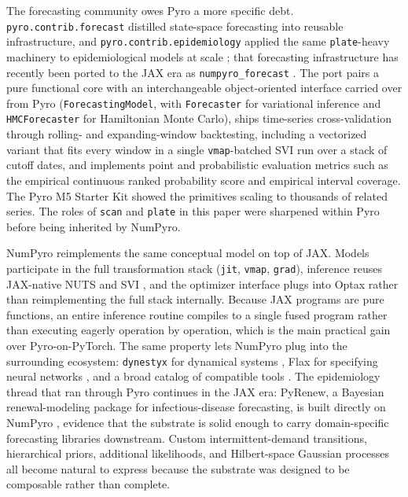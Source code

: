 \documentclass[11pt,3p,review,authoryear]{elsarticle}
\begin{document}
The forecasting community owes Pyro a more specific debt. \texttt{pyro.contrib.forecast} distilled state-space forecasting into reusable infrastructure, and \texttt{pyro.contrib.epidemiology} applied the same \texttt{plate}-heavy machinery to epidemiological models at scale \citep{obermeyer2022pyro}; that forecasting infrastructure has recently been ported to the JAX era as \texttt{numpyro\_forecast} \citep{numpyro_forecast}. The port pairs a pure functional core with an interchangeable object-oriented interface carried over from Pyro (\texttt{ForecastingModel}, with \texttt{Forecaster} for variational inference and \texttt{HMCForecaster} for Hamiltonian Monte Carlo), ships time-series cross-validation through rolling- and expanding-window backtesting, including a vectorized variant that fits every window in a single \texttt{vmap}-batched SVI run over a stack of cutoff dates, and implements point and probabilistic evaluation metrics such as the empirical continuous ranked probability score and empirical interval coverage. The Pyro M5 Starter Kit \citep{pyro_m5_starter} showed the primitives scaling to thousands of related series. The roles of \texttt{scan} and \texttt{plate} in this paper were sharpened within Pyro before being inherited by NumPyro.

NumPyro \citep{phan2019composable} reimplements the same conceptual model on top of JAX. Models participate in the full transformation stack (\texttt{jit}, \texttt{vmap}, \texttt{grad}), inference reuses JAX-native NUTS and SVI \citep{hoffman2014no}, and the optimizer interface plugs into Optax \citep{optax2020github} rather than reimplementing the full stack internally. Because JAX programs are pure functions, an entire inference routine compiles to a single fused program rather than executing eagerly operation by operation, which is the main practical gain over Pyro-on-PyTorch. The same property lets NumPyro plug into the surrounding ecosystem: \texttt{dynestyx} for dynamical systems \citep{dynestyx}, Flax for specifying neural networks \citep{flax2020github}, and a broad catalog of compatible tools \citep{awesome_jax, deepmind2020jax}. The epidemiology thread that ran through Pyro continues in the JAX era: PyRenew, a Bayesian renewal-modeling package for infectious-disease forecasting, is built directly on NumPyro \citep{pyrenew}, evidence that the substrate is solid enough to carry domain-specific forecasting libraries downstream. Custom intermittent-demand transitions, hierarchical priors, additional likelihoods, and Hilbert-space Gaussian processes all become natural to express because the substrate was designed to be composable rather than complete.
\end{document}
